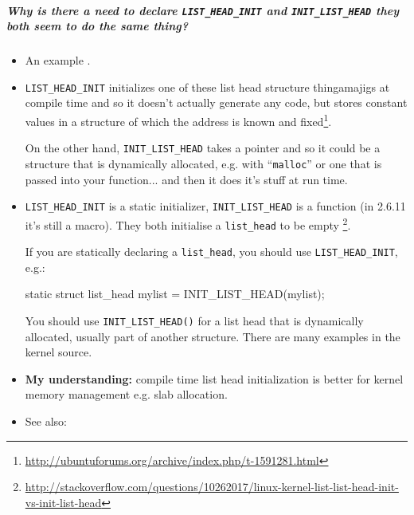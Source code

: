\subparagraph{Why is there a need to declare \texttt{LIST\_HEAD\_INIT} and
  \texttt{INIT\_LIST\_HEAD} they both seem to do the same thing?}

\begin{itemize}
\item An example .
\item \texttt{LIST\_HEAD\_INIT} initializes one of these list head structure thingamajigs at
  compile time and so it doesn't actually generate any code, but stores constant values in
  a structure of which the address is known and
  fixed\footnote{\url{http://ubuntuforums.org/archive/index.php/t-1591281.html}}. 

  On the other hand, \texttt{INIT\_LIST\_HEAD} takes a pointer and so it could be a
  structure that is dynamically allocated, e.g. with ``\texttt{malloc}'' or one that is passed into
  your function... and then it does it's stuff at run time.
\item \texttt{LIST\_HEAD\_INIT} is a static initializer, \texttt{INIT\_LIST\_HEAD} is a
  function (in 2.6.11 it's still a macro). They both initialise a \texttt{list\_head} to be
  empty \footnote{\url{http://stackoverflow.com/questions/10262017/linux-kernel-list-list-head-init-vs-init-list-head}}. 

  If you are statically declaring a \texttt{list\_head}, you should use
  \texttt{LIST\_HEAD\_INIT}, e.g.:

  \begin{center}
\begin{ccode}
static struct list_head mylist = INIT_LIST_HEAD(mylist);
\end{ccode}
  \end{center}
  You should use \texttt{INIT\_LIST\_HEAD()} for a list head that is dynamically allocated,
  usually part of another structure. There are many examples in the kernel source.
\item \textbf{My understanding:} compile time list head initialization is better for
  kernel memory management e.g. slab allocation.
\item See also: 
\end{itemize}

